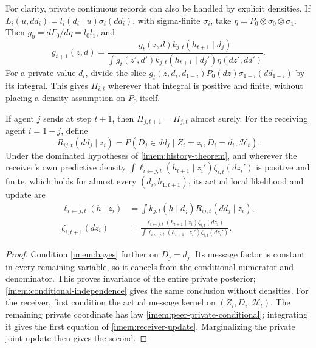 For clarity, private continuous records can also be handled by explicit densities. If $L_i(u,dd_i)=l_i(d_i\mid u)\sigma_i(dd_i)$, with sigma-finite $\sigma_i$, take $\eta=P_0\otimes\sigma_0\otimes\sigma_1$. Then $g_0=d\Gamma_0/d\eta=l_0l_1$, and
\begin{equation}
 g_{t+1}(z,d)=
 \frac{g_t(z,d)k_{j,t}(h_{t+1}\mid d_j)}
 {\int g_t(z',d')k_{j,t}(h_{t+1}\mid d_j')\eta(dz',dd')}.
 \label{imem:dominated-recursion}
\end{equation}
For a private value $d_i$, divide the slice $g_t(z,d_i,d_{1-i})P_0(dz)\sigma_{1-i}(dd_{1-i})$ by its integral. This gives $\Pi_{i,t}$ wherever that integral is positive and finite, without placing a density assumption on $P_0$ itself.

If agent $j$ sends at step $t+1$, then $\Pi_{j,t+1}=\Pi_{j,t}$ almost surely. For the receiving agent $i=1-j$, define
\begin{equation}
 R_{ij,t}(dd_j\mid z_i)
 =P(D_j\in dd_j\mid Z_i=z_i,D_i=d_i,\mathcal H_t).
 \label{imem:peer-private-conditional}
\end{equation}
Under the dominated hypotheses of \cref{imem:history-theorem}, and wherever the receiver's own predictive density $\int\ell_{i\leftarrow j,t}(h_{t+1}\mid z_i')\zeta_{i,t}(dz_i')$ is positive and finite, which holds for almost every $(d_i,h_{1:t+1})$, its actual local likelihood and update are
\begin{equation}
 \begin{aligned}
 \ell_{i\leftarrow j,t}(h\mid z_i)
 &=\int k_{j,t}(h\mid d_j)R_{ij,t}(dd_j\mid z_i),\\
 \zeta_{i,t+1}(dz_i)
 &=\frac{\ell_{i\leftarrow j,t}(h_{t+1}\mid z_i)\zeta_{i,t}(dz_i)}
 {\int\ell_{i\leftarrow j,t}(h_{t+1}\mid z_i')\zeta_{i,t}(dz_i')}.
 \end{aligned}
 \label{imem:receiver-update}
\end{equation}
\begin{proof}
Condition \cref{imem:bayes} further on $D_j=d_j$. Its message factor is constant in every remaining variable, so it cancels from the conditional numerator and denominator. This proves invariance of the entire private posterior; \cref{imem:conditional-independence} gives the same conclusion without densities. For the receiver, first condition the actual message kernel on $(Z_i,D_i,\mathcal H_t)$. The remaining private coordinate has law \cref{imem:peer-private-conditional}; integrating it gives the first equation of \cref{imem:receiver-update}. Marginalizing the private joint update then gives the second.
\end{proof}

